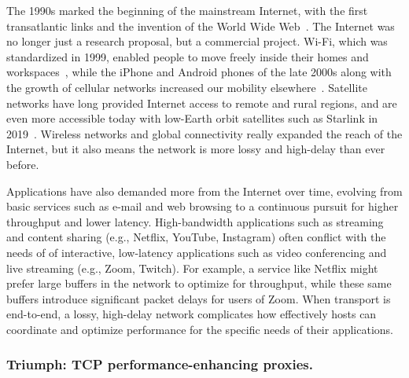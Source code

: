 The 1990s marked the beginning of the mainstream Internet, with the first
transatlantic links and the invention of the World Wide Web~\cite{www2025}. The
Internet was
no longer just a research proposal, but a commercial project. Wi-Fi, which was
standardized in 1999, enabled people to move freely inside their homes and
workspaces~\cite{wifi2023}, while the iPhone and Android phones of the late
2000s along with the growth of cellular networks increased our mobility
elsewhere~\cite{smartphones2024}. Satellite
networks have long provided Internet access to remote and rural regions, and
are even more accessible today with low-Earth orbit satellites such as Starlink
in 2019~\cite{starlink2025}. Wireless networks and global connectivity really
expanded the reach of
the Internet, but it also means the network is more lossy and high-delay than
ever before.

Applications have also demanded more from the Internet over time, evolving from
basic services such as e-mail and web browsing to a continuous pursuit for
higher throughput and lower latency. High-bandwidth applications such as
streaming and content sharing (e.g., Netflix, YouTube, Instagram) often
conflict with the needs of of interactive, low-latency applications such as
video conferencing and live streaming (e.g., Zoom, Twitch). For example, a
service like Netflix might prefer large buffers in the network to optimize for
throughput, while these same buffers introduce significant packet delays for
users of Zoom. When transport is end-to-end, a lossy, high-delay network
complicates how effectively hosts can coordinate and optimize performance for
the specific needs of their applications.

\subsubsection{Triumph: TCP performance-enhancing proxies.}



